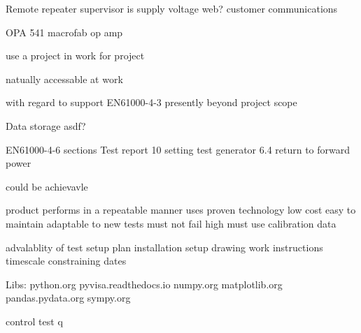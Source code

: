Remote  repeater
supervisor is supply voltage
web?
customer communications

OPA 541 macrofab op amp

use a project in work for project

natually accessable at work

with regard to support EN61000-4-3 presently beyond project scope

Data storage asdf?

EN61000-4-6 sections
Test report 10
setting test generator 6.4
  return to forward power

could be achievavle


product performs in a repeatable manner
uses proven technology
low cost
easy to maintain
adaptable to new tests
must not fail high
must use calibration data

advalablity of test setup
plan installation
setup drawing
work instructions
timescale
constraining dates


Libs:
python.org
pyvisa.readthedocs.io
numpy.org
matplotlib.org
pandas.pydata.org
sympy.org



control test q
